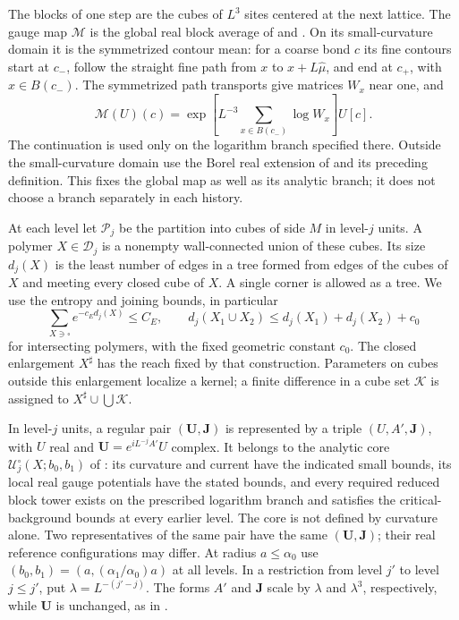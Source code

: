 \documentclass[11pt,letterpaper,reqno]{amsart}
\theoremstyle{definition}
\theoremstyle{remark}
\begin{document}
The blocks of one step are the cubes of $L^3$ sites centered
at the next lattice. The gauge map $\mathcal M$ is the global
real block average of \cite[eq.~3.xvii]{YMM1} and \cite[eq.~3.xviii]{YMM1}.
On its small-curvature domain it is the symmetrized contour
mean: for a coarse bond $c$ its fine contours start at $c_-$,
follow the straight fine path from $x$ to $x+L\hat\mu$, and end at
$c_+$, with $x\in B(c_-)$. The symmetrized path transports
give matrices $W_x$ near one, and
\[
 \mathcal M(U)(c)=
 \exp\left[L^{-3}\sum_{x\in B(c_-)}\log W_x\right]U[c].
\]
The continuation is used only on the logarithm branch specified
there. Outside the small-curvature domain use the Borel real
extension of \cite[Prop.~3.4]{YMM1} and its preceding definition.
This fixes the global map as well as its analytic branch;
it does not choose a branch separately in each history.

At each level let $\mathcal P_j$ be the partition into cubes of side
$M$ in level-$j$ units. A polymer $X\in\mathcal D_j$ is a
nonempty wall-connected union of these cubes. Its size $d_j(X)$
is the least number of edges in a tree formed from edges of the
cubes of $X$ and meeting every closed cube of $X$. A single
corner is allowed as a tree. We use the entropy and joining bounds,
in particular
\[
 \sum_{X\ni\square}e^{-c_Ed_j(X)}\le C_E,
 \qquad
 d_j(X_1\cup X_2)\le d_j(X_1)+d_j(X_2)+c_0
\]
for intersecting polymers, with the fixed geometric constant
$c_0$. The closed enlargement $X^\sharp$ has the reach fixed
by that construction. Parameters on cubes outside this
enlargement localize a kernel; a finite difference in a cube
set $\mathcal K$ is assigned to $X^\sharp\cup\bigcup\mathcal K$.

In level-$j$ units, a regular pair $(\mathbf U,\mathbf J)$ is
represented by a triple $(U,A',\mathbf J)$, with $U$ real and
$\mathbf U=e^{iL^{-j}A'}U$ complex. It belongs to
the analytic core $\mathcal U_j^\circ(X;b_0,b_1)$ of
\cite[Def.~4.26]{YMM1}: its curvature and current have the
indicated small bounds, its local real gauge potentials have
the stated bounds, and every required reduced block tower
exists on the prescribed logarithm branch and satisfies the
critical-background bounds at every earlier level.
The core is not defined by curvature alone. Two representatives
of the same pair have the same $(\mathbf U,\mathbf J)$;
their real reference configurations may differ. At radius
$a\le\alpha_0$ use
$(b_0,b_1)=(a,(\alpha_1/\alpha_0)a)$ at all levels.
In a restriction from level $j'$ to level $j\le j'$, put
$\lambda=L^{-(j'-j)}$. The forms $A'$ and $\mathbf J$ scale by
$\lambda$ and $\lambda^3$, respectively, while $\mathbf U$ is
unchanged, as in \cite[eq.~4.cxxiv]{YMM1}.
\end{document}
